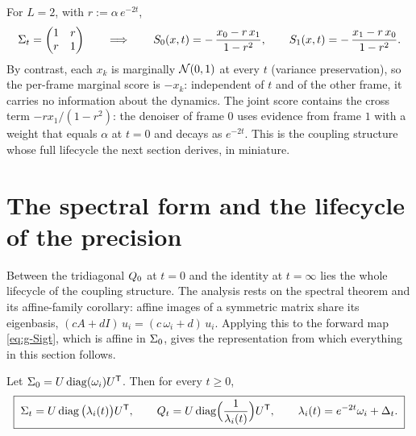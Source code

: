 For $L = 2$, with $r := \alpha\, e^{-2t}$,
\begin{equation}
  \Sigma_t = \begin{pmatrix} 1 & r \\ r & 1 \end{pmatrix}
  \qquad\Longrightarrow\qquad
  S_0(x, t) = -\,\frac{x_0 - r\, x_1}{1 - r^2},
  \qquad
  S_1(x, t) = -\,\frac{x_1 - r\, x_0}{1 - r^2}.
  \label{eq:g-K2-score}
\end{equation}
By contrast, each $x_k$ is marginally $\mathcal{N}(0,1)$ at every $t$ (variance
preservation), so the per-frame marginal score is $-x_k$: independent of
$t$ and of the other frame, it carries no information about the dynamics.
The joint score contains the cross term $-r x_1/(1-r^2)$: the denoiser of
frame $0$ uses evidence from frame $1$ with a weight that equals $\alpha$
at $t = 0$ and decays as $e^{-2t}$. This is the coupling structure whose
full lifecycle the next section derives, in miniature.

\section{The spectral form and the lifecycle of the precision}
\label{sec:g-lifecycle}

Between the tridiagonal $Q_0$ at $t = 0$ and the identity at $t = \infty$ lies
the whole lifecycle of the coupling structure. The analysis rests on the
spectral theorem
and its affine-family corollary: affine
images of a symmetric matrix share its eigenbasis,
$(cA + dI)\, u_i = (c\,\omega_i + d)\, u_i$. Applying this to the
forward map \eqref{eq:g-Sigt}, which is affine in $\Sigma_0$, gives the
representation from which everything in this section follows.

\begin{theorem}\label{thm:g-three-forms}
Let $\Sigma_0 = U \operatorname{diag}(\omega_i) U^{\mathsf{T}}$. Then for every
$t \geq 0$,
\begin{equation}
  \boxed{\;
  \Sigma_t = U \operatorname{diag}\big( \lambda_i(t) \big) U^{\mathsf{T}},
  \qquad
  Q_t = U \operatorname{diag}\!\Big( \frac{1}{\lambda_i(t)} \Big) U^{\mathsf{T}},
  \qquad
  \lambda_i(t) = e^{-2t} \omega_i + \Delta_t .
  \;}
  \label{eq:g-Qt-spec}
\end{equation}
\end{theorem}

